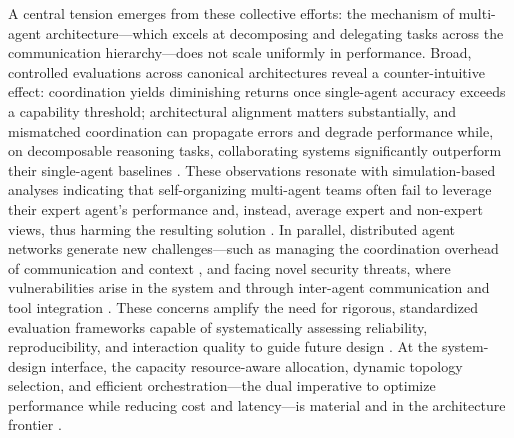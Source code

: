 \documentclass[11pt,a4paper]{article}
\begin{document}
A central tension emerges from these collective efforts: the mechanism of multi-agent architecture---which excels at decomposing and delegating tasks across the communication hierarchy---does not scale uniformly in performance. Broad, controlled evaluations across canonical architectures reveal a counter-intuitive effect: coordination yields diminishing returns once single-agent accuracy exceeds a capability threshold; architectural alignment matters substantially, and mismatched coordination can propagate errors and degrade performance while, on decomposable reasoning tasks, collaborating systems significantly outperform their single-agent baselines \cite{arxiv:2512.08296v3}. These observations resonate with simulation-based analyses indicating that self-organizing multi-agent teams often fail to leverage their expert agent's performance and, instead, average expert and non-expert views, thus harming the resulting solution \cite{arxiv:2602.01011v4}. In parallel, distributed agent networks generate new challenges---such as managing the coordination overhead of communication and context \cite{arxiv:2506.06843v3}, and facing novel security threats, where vulnerabilities arise in the system and through inter-agent communication and tool integration \cite{arxiv:2506.01245v3,arxiv:2506.01245v3}. These concerns amplify the need for rigorous, standardized evaluation frameworks capable of systematically assessing reliability, reproducibility, and interaction quality to guide future design \cite{arxiv:2506.12508v6,arxiv:2505.16988v2}. At the system-design interface, the capacity resource-aware allocation, dynamic topology selection, and efficient orchestration---the dual imperative to optimize performance while reducing cost and latency---is material and in the architecture frontier \cite{arxiv:2502.11133v1,arxiv:2506.12508v6,arxiv:1311.5108v1}.
\end{document}
